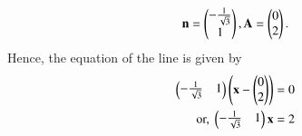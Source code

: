 \begin{align}
    \mathbf{n} =  \begin{pmatrix}-\frac{1}{\sqrt{3}} \\ 1\end{pmatrix},
    \mathbf{A} = \begin{pmatrix}0 \\ 2\end{pmatrix}.
\end{align}
Hence, 
the equation of the line is given by
\begin{align}
\begin{pmatrix}-\frac{1}{\sqrt{3}}&1\end{pmatrix}\left( \mathbf{x} - \begin{pmatrix}0 \\ 2\end{pmatrix}\right) &= 0  \\
    \text{or, }	\begin{pmatrix}-\frac{1}{\sqrt{3}}&1\end{pmatrix} \mathbf{x}  &= 2
\end{align}
%

